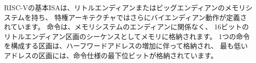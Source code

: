\begin{comment}
RISC-V base ISAs have either little-endian or big-endian memory systems,
with the privileged architecture further defining bi-endian operation.
Instructions are stored in memory as a sequence of 16-bit little-endian
parcels, regardless of memory system endianness.
Parcels forming one instruction are stored at increasing
halfword addresses, with the lowest-addressed parcel holding the
lowest-numbered bits in the instruction specification.
\end{comment}

RISC-Vの基本ISAは、リトルエンディアンまたはビッグエンディアンのメモリシステムを持ち、
特権アーキテクチャではさらにバイエンディアン動作が定義されています。
命令は、メモリシステムのエンディアンに関係なく、
16ビットのリトルエンディアン区画のシーケンスとしてメモリに格納されます。
1つの命令を構成する区画は、ハーフワードアドレスの増加に伴って格納され、
最も低いアドレスの区画には、命令仕様の最下位ビットが格納されています。


